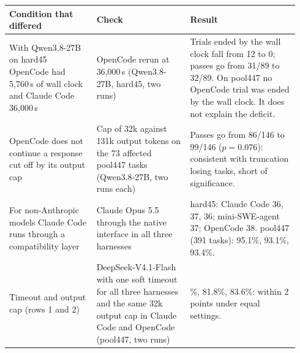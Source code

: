 \footnotesize\setlength{\tabcolsep}{4pt}
\begin{tabular}{@{}>{\raggedright\arraybackslash}p{0.29\linewidth}>{\raggedright\arraybackslash}p{0.30\linewidth}>{\raggedright\arraybackslash}p{0.35\linewidth}@{}}
\toprule
Condition that differed & Check & Result \\
\midrule
With Qwen3.8-27B on hard45 OpenCode had 5{,}760\,s of wall clock and Claude Code 36{,}000\,s &
OpenCode rerun at 36{,}000\,s (Qwen3.8-27B, hard45, two runs) &
Trials ended by the wall clock fall from 12 to 0; passes go from 31/89 to 32/89. On pool447 no OpenCode trial was ended by the wall clock. It does not explain the deficit. \\
\addlinespace
OpenCode does not continue a response cut off by its output cap &
Cap of 32k against 131k output tokens on the 73 affected pool447 tasks (Qwen3.8-27B, two runs each) &
Passes go from 86/146 to 99/146 ($p = 0.076$): consistent with truncation losing tasks, short of significance. \\
\addlinespace
For non-Anthropic models Claude Code runs through a compatibility layer &
Claude Opus 5.5 through the native interface in all three harnesses &
hard45: Claude Code 36, 37, 36; mini-SWE-agent 37; OpenCode 38. pool447 (391 tasks): 95.1\%, 93.1\%, 93.4\%. \\
\addlinespace
Timeout and output cap (rows 1 and 2) &
DeepSeek-V4.1-Flash with one soft timeout for all three harnesses and the same 32k output cap in Claude Code and OpenCode (pool447, two runs) &
83.4\%, 81.8\%, 83.6\%: within 2 points under equal settings. \\
\bottomrule
\end{tabular}
